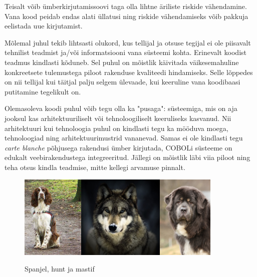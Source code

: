 \documentclass{tufte-book}
\begin{document}
Teisalt võib ümberkirjutamissoovi taga olla lihtne äriliste riskide vähendamine. Vana kood peidab endas alati üllatusi ning riskide vähendamiseks võib pakkuja eelistada uue kirjutamist. 

Mõlemal juhul tekib lihtsasti olukord, kus tellijal ja otsuse tegijal ei ole piisavalt tehnilist teadmist ja/või informatsiooni vana süsteemi kohta. Erinevalt koodist teadmus kindlasti kõduneb. Sel puhul on mõistlik käivitada väikesemahuline konkreetsete tulemustega piloot rakenduse kvaliteedi hindamiseks. Selle lõppedes on nii tellijal kui täitjal palju selgem ülevaade, kui keeruline vana koodibaasi putitamine tegelikult on.

Olemasoleva koodi puhul võib tegu olla ka "pusaga": süsteemiga, mis on aja jooksul kas arhitektuuriliselt või tehnoloogiliselt keeruliseks kasvanud. Nii arhitektuuri kui tehnoloogia puhul on kindlasti tegu ka mööduva moega, tehno\-loogiad ning arhitektuurimustrid vananevad. Samas ei ole kindlasti tegu \textit{carte blanche} põhjusega rakendusi ümber kirjutada, COBOLi süsteeme on edukalt veebirakendustega integreeritud. Jällegi on mõistlik läbi viia piloot ning teha otsus kindla teadmise, mitte kellegi arvamuse pinnalt.

\begin{figure}[htp]
	\begin{center}
		\includegraphics[height=4cm]{spaniel.jpg}\includegraphics[height=4cm]{wolf.jpg}\includegraphics[height=4cm]{mastiff.jpg}
		\caption{Spanjel, hunt ja mastif}
	\end{center}
\end{figure}
\end{document}
